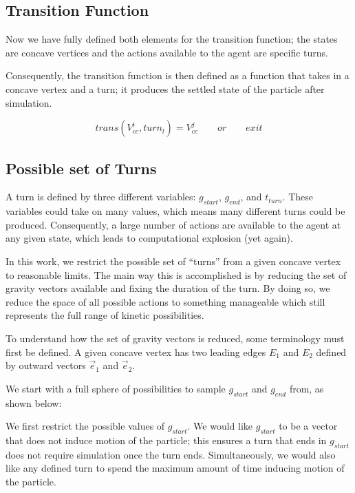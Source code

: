 	\subsection{Transition Function}

Now we have fully defined both elements for the transition function; the states are concave vertices and the actions available to the agent are specific turns.

Consequently, the transition function is then defined as a function that takes in a concave vertex and a turn; it produces the settled state of the particle after simulation.

$$
trans(V_{cc}^{i}, turn_{l}) = V_{cc}^j \qquad or \qquad exit
$$

	\subsection{Possible set of Turns}

A turn is defined by three different variables: $g_{start}$, $g_{end}$, and $t_{turn}$. These variables could take on many values, which means many different turns could be produced. Consequently, a large number of actions are available to the agent at any given state, which leads to computational explosion (yet again).


In this work, we restrict the possible set of ``turns'' from a given concave vertex to reasonable limits. The main way this is accomplished is by reducing the set of gravity vectors available and fixing the duration of the turn. By doing so, we reduce the space of all possible actions to something manageable which still represents the full range of kinetic possibilities.


To understand how the set of gravity vectors is reduced, some terminology must first be defined. A given concave vertex has two leading edges $E_1$ and $E_2$ defined by outward vectors $\vec{e}_1$ and $\vec{e}_2$.


We start with a full sphere of possibilities to sample $g_{start}$ and $g_{end}$ from, as shown below:


We first restrict the possible values of $g_{start}$. We would like $g_{start}$ to be a vector that does not induce motion of the particle; this ensures a turn that ends in $g_{start}$ does not require simulation once the turn ends. Simultaneously, we would also like any defined turn to spend the maximum amount of time inducing motion of the particle.

